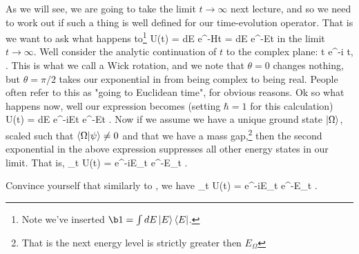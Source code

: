 As we will see, we are going to take the limit $t\to\infty$ next lecture, and so we need to work out if such a thing is well defined for our time-evolution operator. That is we want to ask what happens to\footnote{Note we've inserted $\b1=\int dE \ket{E}\bra{E}$.}
\be 
\label{eqn:UWickRotation}
    U(t)\ket{\psi} = \int dE e^{-Ht}  = \int dE e^{-Et} 
\ee 
in the limit $t\to\infty$. Well consider the analytic continuation of $t$ to the complex plane:
\be 
\label{eqn:WickRotation}
    t \to e^{-i\theta} t, \qquad \theta\in [0,\pi/2].
\ee  
This is what we call a Wick rotation, and we note that $\theta=0$ changes nothing, but $\theta=\pi/2$ takes our exponential in  from being complex to being real. People often refer to this as "going to Euclidean time", for obvious reasons. Ok so what happens now, well our expression becomes (setting $\hbar=1$ for this calculation)
\bse 
    U(t)\ket{\psi} = \int dE e^{-i\cos\theta Et} e^{-\sin\theta Et} .
\ese 
Now if we assume we have a unique ground state $\ket{\Omega}$, scaled such that $\braket{\Omega}{\psi} \neq 0$ and that we have a mass gap,\footnote{That is the next energy level is strictly greater then $E_{\Omega}$} then the second exponential in the above expression suppresses all other energy states in our limit. That is, 
\be 
\label{eqn:UWickRotationLimit}
    \lim_{t\to\infty} U(t)\ket{\psi} = e^{-i\cos\theta E_{\Omega}t} e^{-\sin\theta E_{\Omega}t} \ket{\Omega}\braket{\Omega}{\psi}.
\ee 

\bbox 
    Convince yourself that similarly to , we have 
    \bse 
        \lim_{t\to\infty} \bra{\psi}U(t) = e^{-i\cos\theta E_{\Omega}t} e^{-\sin\theta E_{\Omega}t} \bra{\Omega}\braket{\psi}{\Omega}.
    \ese 
\ebox 